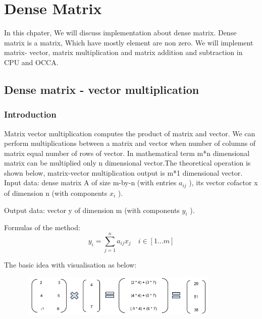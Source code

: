 \chapter{Dense Matrix}

In this chpater, We will discuss implementation about dense matrix. Dense matrix is a matrix, Which have mostly element are non zero. We will implement matrix- vector, matrix multiplication and matrix addition and subtraction in CPU and OCCA.

\section{Dense matrix - vector multiplication}
\subsection{Introduction}
Matrix vector multiplication computes the product of matrix and vector. We can perform multiplications between a matrix and vector when number of columns of matrix equal number of rows of vector. In mathematical term m*n dimensional matrix can be multiplied only n dimensional vector.The theoretical operation is shown below, matrix-vector multiplication output is m*1 dimensional vector.\\
Input data: dense matrix A
 of size m-by-n (with entries $a_{ij}$
), its vector cofactor x
 of dimension n (with components $x_i$
).

Output data: vector y
 of dimension m (with components $y_i$
).

Formulas of the method:
\begin{equation}
	y_i = \sum _{j=1}^{n} a_{ij}x_j \quad   i \in [1...m]
\end{equation}

The basic idea with visualisation as below:
\begin{center}
	
\end{center}
\includegraphics[width=12cm, height=2cm]{Chapters/matrix-vector-multiplication.png}

